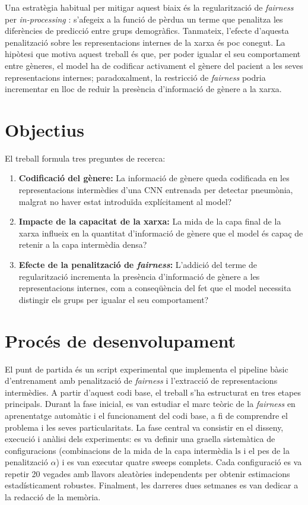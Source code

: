 \documentclass[a4paper,12pt,twoside]{ThesisStyle}
\begin{document}
Una estratègia habitual per mitigar aquest biaix és la regularització de \textit{fairness} per \textit{in-processing} \cite{Barocas2023}: s'afegeix a la funció de pèrdua un terme que penalitza les diferències de predicció entre grups demogràfics. Tanmateix, l'efecte d'aquesta penalització sobre les representacions internes de la xarxa és poc conegut. La hipòtesi que motiva aquest treball és que, per poder igualar el seu comportament entre gèneres, el model ha de codificar activament el gènere del pacient a les seves representacions internes; paradoxalment, la restricció de \textit{fairness} podria incrementar en lloc de reduir la presència d'informació de gènere a la xarxa.

\section*{Objectius}

El treball formula tres preguntes de recerca:

\begin{enumerate}
    \item \textbf{Codificació del gènere:} La informació de gènere queda codificada en les representacions intermèdies d'una CNN entrenada per detectar pneumònia, malgrat no haver estat introduïda explícitament al model?
    \item \textbf{Impacte de la capacitat de la xarxa:} La mida de la capa final de la xarxa influeix en la quantitat d'informació de gènere que el model és capaç de retenir a la capa intermèdia densa?
    \item \textbf{Efecte de la penalització de \textit{fairness}:} L'addició del terme de regularització incrementa la presència d'informació de gènere a les representacions internes, com a conseqüència del fet que el model necessita distingir els grups per igualar el seu comportament?
\end{enumerate}

\section*{Procés de desenvolupament}

El punt de partida és un script experimental que implementa el pipeline bàsic d'entrenament amb penalització de \textit{fairness} i l'extracció de representacions intermèdies. A partir d'aquest codi base, el treball s'ha estructurat en tres etapes principals. Durant la fase inicial, es van estudiar el marc teòric de la \textit{fairness} en aprenentatge automàtic i el funcionament del codi base, a fi de comprendre el problema i les seves particularitats. La fase central va consistir en el disseny, execució i anàlisi dels experiments: es va definir una graella sistemàtica de configuracions (combinacions de la mida de la capa intermèdia $\text{ls}$ i el pes de la penalització $\alpha$) i es van executar quatre sweeps complets. Cada configuració es va repetir 20 vegades amb llavors aleatòries independents per obtenir estimacions estadísticament robustes. Finalment, les darreres dues setmanes es van dedicar a la redacció de la memòria.
\end{document}
